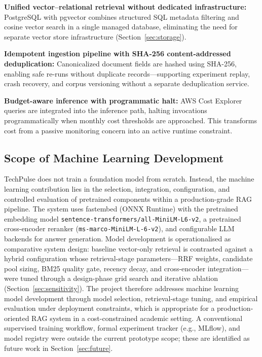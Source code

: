 \textbf{Unified vector--relational retrieval without dedicated infrastructure:} PostgreSQL with pgvector combines structured SQL metadata filtering and cosine vector search in a single managed database, eliminating the need for separate vector store infrastructure (Section~\ref{sec:storage}).

\textbf{Idempotent ingestion pipeline with SHA-256 content-addressed deduplication:} Canonicalized document fields are hashed using SHA-256, enabling safe re-runs without duplicate records---supporting experiment replay, crash recovery, and corpus versioning without a separate deduplication service.

\textbf{Budget-aware inference with programmatic halt:} AWS Cost Explorer queries are integrated into the inference path, halting invocations programmatically when monthly cost thresholds are approached. This transforms cost from a passive monitoring concern into an active runtime constraint.

\subsection{Scope of Machine Learning Development}
\label{sec:ml_scope}

TechPulse does not train a foundation model from scratch. Instead, the machine learning contribution lies in the selection, integration, configuration, and controlled evaluation of pretrained components within a production-grade RAG pipeline. The system uses fastembed (ONNX Runtime) with the pretrained embedding model \texttt{sentence-transformers/all-MiniLM-L6-v2}, a pretrained cross-encoder reranker (\texttt{ms-marco-MiniLM-L-6-v2}), and configurable LLM backends for answer generation. Model development is operationalised as comparative system design: baseline vector-only retrieval is contrasted against a hybrid configuration whose retrieval-stage parameters---RRF weights, candidate pool sizing, BM25 quality gate, recency decay, and cross-encoder integration---were tuned through a design-phase grid search and iterative ablation (Section~\ref{sec:sensitivity}). The project therefore addresses machine learning model development through model selection, retrieval-stage tuning, and empirical evaluation under deployment constraints, which is appropriate for a production-oriented RAG system in a cost-constrained academic setting. A conventional supervised training workflow, formal experiment tracker (e.g., MLflow), and model registry were outside the current prototype scope; these are identified as future work in Section~\ref{sec:future}.

